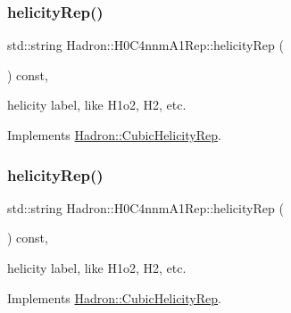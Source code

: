 \mbox{\label{structHadron_1_1H0C4nnmA1Rep_aac6980c132c730c917ea06f915c2cd21}} 
\subsubsection{\texorpdfstring{helicityRep()}{helicityRep()}\hspace{0.1cm}{\footnotesize\ttfamily [1/2]}}
{\footnotesize\ttfamily std\+::string Hadron\+::\+H0\+C4nnm\+A1\+Rep\+::helicity\+Rep (\begin{DoxyParamCaption}{ }\end{DoxyParamCaption}) const\hspace{0.3cm}{\ttfamily [inline]}, {\ttfamily [virtual]}}

helicity label, like H1o2, H2, etc. 

Implements \mbox{\hyperlink{structHadron_1_1CubicHelicityRep_af1096946b7470edf0a55451cc662f231}{Hadron\+::\+Cubic\+Helicity\+Rep}}.

\mbox{\label{structHadron_1_1H0C4nnmA1Rep_aac6980c132c730c917ea06f915c2cd21}} 
\subsubsection{\texorpdfstring{helicityRep()}{helicityRep()}\hspace{0.1cm}{\footnotesize\ttfamily [2/2]}}
{\footnotesize\ttfamily std\+::string Hadron\+::\+H0\+C4nnm\+A1\+Rep\+::helicity\+Rep (\begin{DoxyParamCaption}{ }\end{DoxyParamCaption}) const\hspace{0.3cm}{\ttfamily [inline]}, {\ttfamily [virtual]}}

helicity label, like H1o2, H2, etc. 

Implements \mbox{\hyperlink{structHadron_1_1CubicHelicityRep_af1096946b7470edf0a55451cc662f231}{Hadron\+::\+Cubic\+Helicity\+Rep}}.

\mbox{\label{structHadron_1_1H0C4nnmA1Rep_a99c77d4cddc66d00c5fbeb5e4927dfba}} 
